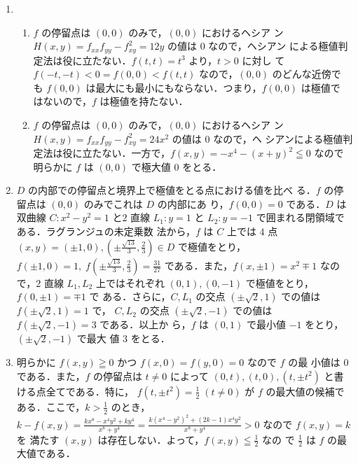 \documentclass[11pt, uplatex, dvipdfmx, twoside]{jsarticle}
\begin{document}
 \begin{enumerate}[label=\ref{sec:extremal}.\arabic*]
   \setlength{\itemsep}{1ex}
   
 \item
   \begin{enumerate}[label=(\arabic*)]
     \setlength{\itemsep}{1ex}
     
   \item $f$ の停留点は $(0,0)$ のみで，$(0,0)$ におけるヘシア
     ン $H(x,y) = f_{xx} f_{yy} - f_{xy}^2=12y$ の値は $0$ なので，ヘシアン
     による極値判定法は役に立たない．$f(t,t) = t^3$ より，$t>0$ に対し
     て $f(-t,-t)<0 = f(0,0) < f(t,t)$ なので，$(0,0)$ のどんな近傍で
     も $f(0,0)$ は最大にも最小にもならない．つまり，$f(0,0)$ は極値で
     はないので，$f$ は極値を持たない．

   \item $f$ の停留点は $(0,0)$ のみで，$(0,0)$ におけるヘシア
     ン $H(x,y) = f_{xx} f_{yy} - f_{xy}^2=24x^2$ の値は $0$ なので，ヘ
     シアンによる極値判定法は役に立たない．一方で，$f(x,y) = -x^4 -
     (x+y)^2 \leqq 0$ なので明らかに $f$ は $(0,0)$ で極大値 $0$ をとる．
   \end{enumerate}

 \item $D$ の内部での停留点と境界上で極値をとる点における値を比べ
   る．$f$ の停留点は $(0,0)$ のみでこれは $D$ の内部にあ
   り，$f(0,0)=0$ である．$D$ は双曲線 $C :x^2-y^2=1$ と$2$ 直線 $L_1
   : y=1$ と $L_2: y=-1$ で囲まれる閉領域である．ラグランジュの未定乗数
   法から，$f$ は $C$ 上では $4$ 点
   $(x, y) =(\pm 1, 0), \left(\pm \frac{\sqrt{13}}{3},
     \frac{2}{3}\right) \in D$
   で極値をとり，$f(\pm 1, 0) =1, \; f\left(\pm \frac{\sqrt{13}}{3},
     \frac{2}{3}\right) = \frac{31}{27}$
   である．また，$f(x, \pm 1) = x^2 \mp 1$ なので，$2$ 直線 $L_1, L_2$
   上ではそれぞれ $(0,1), (0,-1)$ で極値をとり，$f(0,\pm 1) = \mp 1$ で
   ある．さらに，$C, L_1$ の交点 $(\pm \sqrt{2}, 1)$ での値は
   $f(\pm \sqrt{2}, 1) = 1$ で， $C, L_2$ の交点 $(\pm \sqrt{2}, -1)$
   での値は $f(\pm \sqrt{2}, -1) =3$ である．以上か
   ら，$f$ は $(0,1)$ で最小値 $-1$ をとり，$(\pm \sqrt{2}, -1)$ で最大
   値 $3$ をとる．

 \item 明らかに $f(x,y) \geqq 0$ かつ $f(x,0)=f(y,0)=0$ なので $f$ の最
   小値は $0$ である．また，$f$ の停留点は $t \neq 0$ によって
   $(0,t), (t,0), (t,\pm t^2)$ と書ける点全てである．特に，
   $f(t, \pm t^2) = \frac{1}{2} \; (t \neq 0) $ が $f$ の最大値の候補で
   ある．ここで，$k >\frac{1}{2}$
   のとき，$k - f(x,y) = \frac{kx^8-x^4y^2+ky^4}{x^8+y^4} =
   \frac{k(x^4-y^2)^2+(2k-1)x^4y^2}{x^8+y^4} >0$ なので $f(x,y) = k$ を
   満たす $(x,y)$ は存在しない．よって，$f(x,y) \leqq \frac{1}{2}$ なの
   で $\frac{1}{2}$ は $f$ の最大値である．
 \end{enumerate}
\end{document}
